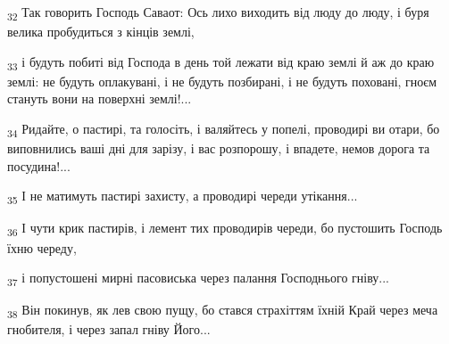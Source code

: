 \begin{tcolorbox}
\textsubscript{32} Так говорить Господь Саваот: Ось лихо виходить від люду до люду, і буря велика пробудиться з кінців землі,
\end{tcolorbox}
\begin{tcolorbox}
\textsubscript{33} і будуть побиті від Господа в день той лежати від краю землі й аж до краю землі: не будуть оплакувані, і не будуть позбирані, і не будуть поховані, гноєм стануть вони на поверхні землі!...
\end{tcolorbox}
\begin{tcolorbox}
\textsubscript{34} Ридайте, о пастирі, та голосіть, і валяйтесь у попелі, проводирі ви отари, бо виповнились ваші дні для зарізу, і вас розпорошу, і впадете, немов дорога та посудина!...
\end{tcolorbox}
\begin{tcolorbox}
\textsubscript{35} І не матимуть пастирі захисту, а проводирі череди утікання...
\end{tcolorbox}
\begin{tcolorbox}
\textsubscript{36} І чути крик пастирів, і лемент тих проводирів череди, бо пустошить Господь їхню череду,
\end{tcolorbox}
\begin{tcolorbox}
\textsubscript{37} і попустошені мирні пасовиська через палання Господнього гніву...
\end{tcolorbox}
\begin{tcolorbox}
\textsubscript{38} Він покинув, як лев свою пущу, бо стався страхіттям їхній Край через меча гнобителя, і через запал гніву Його...
\end{tcolorbox}
